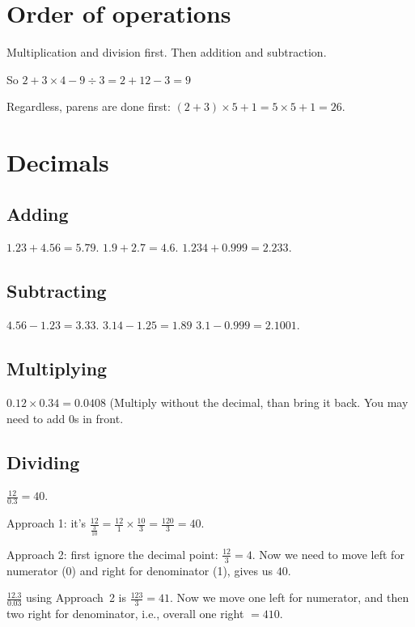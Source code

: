 \documentclass[fullpage,twocolumn]{article}
\begin{document}
\section{Order of operations}

Multiplication and division first. Then addition and subtraction.

So $2 + 3 \times 4 - 9 \div 3 = 2 + 12 - 3 = 9$

Regardless, parens are done first: $(2 + 3 ) \times 5 + 1 = 5 \times 5 + 1 = 26$.

\section{Decimals}

\subsection{Adding}

$1.23 + 4.56 = 5.79$. $1.9 + 2.7 = 4.6$. $1.234 + 0.999 = 2.233$.

\subsection{Subtracting}

$4.56 - 1.23 = 3.33$. $3.14 - 1.25 = 1.89$ $3.1 - 0.999 = 2.1001$.

\subsection{Multiplying}

$0.12 \times 0.34 = 0.0408$ (Multiply without the decimal, than bring it back.
You may need to add 0s in front.

\subsection{Dividing}

$\frac{12}{0.3} = 40$. 

Approach 1: it's $\frac{12}{\frac{3}{10}} = \frac{12}{1}\times\frac{10}{3} = \frac{120}{3} = 40$.

Approach 2: first ignore the decimal point: $\frac{12}{3} = 4$. Now we need
to move left for numerator (0) and right for denominator (1), gives us $40$.

$\frac{12.3}{0.03}$ using Approach~2 is $\frac{123}{3} = 41$. Now we move one left
for numerator, and then two right for denominator, i.e., overall one right $ = 410$.
\end{document}
